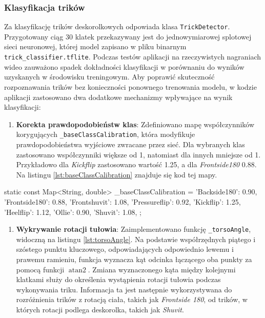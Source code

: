             \subsubsection{Klasyfikacja trików}
                Za klasyfikację trików deskorolkowych odpowiada klasa \texttt{TrickDetector}. Przygotowany ciąg 30 klatek przekazywany jest do jednowymiarowej splotowej sieci neuronowej, której model zapisano w pliku binarnym \texttt{trick\_classifier.tflite}. Podczas testów aplikacji na rzeczywistych nagraniach wideo zauważono spadek dokładności klasyfikacji w porównaniu do wyników uzyskanych w środowisku treningowym. Aby poprawić skuteczność rozpoznawania trików bez konieczności ponownego trenowania modelu, w kodzie aplikacji zastosowano dwa dodatkowe mechanizmy wpływające na wynik klasyfikacji:
                \begin{enumerate}
                    \item \textbf{Korekta prawdopodobieństw klas}: Zdefiniowano mapę współczynników korygujących \texttt{\_baseClassCalibration}, która modyfikuje prawdopodobieństwa wyjściowe zwracane przez sieć. Dla wybranych klas zastosowano współczynniki większe od 1, natomiast dla innych mniejsze od 1. Przykładowo dla \textit{Kickflip} zastosowano wartość 1.25, a dla \textit{Frontside180} 0.88. Na listingu \ref{lst:baseClassCalibration} znajduje się kod tej mapy.
                \end{enumerate}

        \begin{code}[
                language=Dart,
                caption={Mapa \texttt{\_baseClassCalibration}.},
                label={lst:baseClassCalibration}
            ]
static const Map<String, double> _baseClassCalibration = {
'Backside180': 0.90,
'Frontside180': 0.88,
'Frontshuvit': 1.08,
'Pressureflip': 0.92,
'Kickflip': 1.25,
'Heelflip': 1.12,
'Ollie': 0.90,
'Shuvit': 1.08,
};\end{code}   
    \begin{enumerate}[resume]
    \item \textbf{Wykrywanie rotacji tułowia}: Zaimplementowano funkcję \texttt{\_torsoAngle}, widoczną na listingu \ref{lst:torsoAngle}. Na podstawie współrzędnych piątego i szóstego punktu kluczowego, odpowiadających odpowiednio lewemu i prawemu ramieniu, funkcja wyznacza kąt odcinka łączącego oba punkty za pomocą funkcji $\operatorname{atan2}$. Zmiana wyznaczonego kąta między kolejnymi klatkami służy do określenia wystąpienia rotacji tułowia podczas wykonywania triku. Informacja ta jest następnie wykorzystywana do rozróżnienia trików z rotacją ciała, takich jak \textit{Frontside 180}, od trików, w których rotacji podlega deskorolka, takich jak \textit{Shuvit}.
    \end{enumerate}

